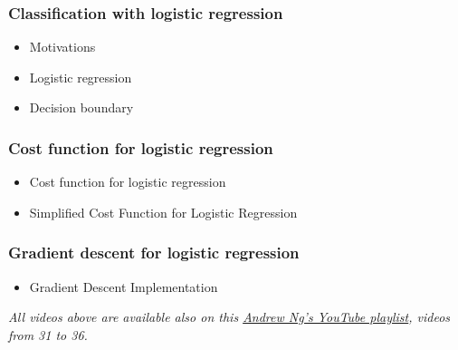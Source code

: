 \subsubsection*{Classification with logistic regression}
\begin{itemize}
  \item Motivations
  \item Logistic regression
  \item Decision boundary
\end{itemize}

\subsubsection*{Cost function for logistic regression}
\begin{itemize}
  \item Cost function for logistic regression
  \item Simplified Cost Function for Logistic Regression
\end{itemize}

\subsubsection*{Gradient descent for logistic regression}
\begin{itemize}
  \item Gradient Descent Implementation
\end{itemize}


\emph{All videos above are available also on this \href{https://youtube.com/playlist?list=PLkDaE6sCZn6FNC6YRfRQc_FbeQrF8BwGI&feature=shared}{Andrew Ng's YouTube playlist}, videos from 31 to 36.}

